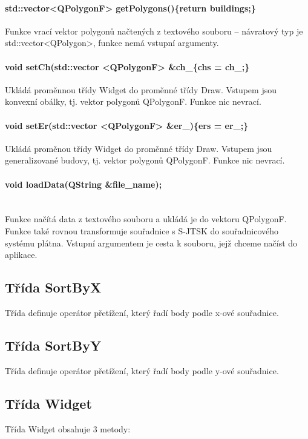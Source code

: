 \documentclass[11pt]{article}
\begin{document}
 	\paragraph{std::vector<QPolygonF> getPolygons()\{return buildings;\}}
 	
 	Funkce vrací vektor polygonů načtených z textového souboru – návratový typ je std::vector<QPolygon>, funkce nemá vstupní argumenty.
 	
	\paragraph{void setCh(std::vector <QPolygonF> \&ch\_\{chs = ch\_;\}}
	Ukládá proměnnou třídy Widget do proměnné třídy Draw. Vstupem jsou konvexní obálky, tj. vektor polygonů QPolygonF. Funkce nic nevrací.
	
	\paragraph{void setEr(std::vector <QPolygonF> \&er\_)\{ers = er\_;\}}
	Ukládá proměnou třídy Widget do proměnné třídy Draw. Vstupem jsou generalizované budovy, tj. vektor polygonů QPolygonF. Funkce nic nevrací.
 	
 	\paragraph{void loadData(QString \&file\_name);}\mbox{}\\
 	Funkce načítá data z textového souboru a ukládá je do vektoru QPolygonF. Funkce také rovnou transformuje souřadnice s S-JTSK do souřadnicového systému plátna. Vstupní argumentem je cesta k souboru, jejž chceme načíst do aplikace.   
 	
 	\subsection{Třída SortByX}
 	Třída definuje operátor přetížení, který řadí body podle x-ové souřadnice.
 	
 	\subsection{Třída SortByY}
 	Třída definuje operátor přetížení, který řadí body podle y-ové souřadnice.
 	
 	\subsection{Třída Widget}
 	Třída Widget obsahuje 3 metody:
 	
\end{document}

